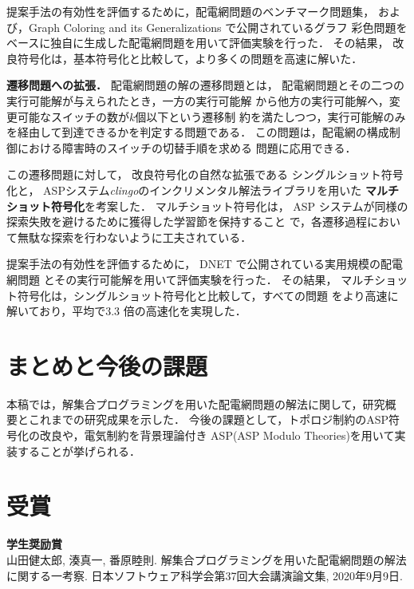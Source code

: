 \documentclass[a4j,10pt,dvipdfmx]{jarticle}
\begin{document}
\begin{multicols}{1}
提案手法の有効性を評価するために，配電網問題のベンチマーク問題集，
および，Graph Coloring and its Generalizations で公開されているグラフ
彩色問題をベースに独自に生成した配電網問題を用いて評価実験を行った．
その結果，
改良符号化は，基本符号化と比較して，より多くの問題を高速に解いた．

\textbf{遷移問題への拡張．}
配電網問題の解の遷移問題とは，
配電網問題とその二つの実行可能解が与えられたとき，一方の実行可能解
から他方の実行可能解へ，変更可能なスイッチの数が$k$個以下という遷移制
約を満たしつつ，実行可能解のみを経由して到達できるかを判定する問題である．
この問題は，配電網の構成制御における障害時のスイッチの切替手順を求める
問題に応用できる．

この遷移問題に対して，
改良符号化の自然な拡張である
シングルショット符号化と，
ASPシステム\textit{clingo}のインクリメンタル解法ライブラリを用いた
\textbf{マルチショット符号化}を考案した．
マルチショット符号化は，
ASP システムが同様の探索失敗を避けるために獲得した学習節を保持すること
で，各遷移過程において無駄な探索を行わないように工夫されている．

提案手法の有効性を評価するために，
DNET で公開されている実用規模の配電網問題
とその実行可能解を用いて評価実験を行った．
その結果，
マルチショット符号化は，シングルショット符号化と比較して，すべての問題
をより高速に解いており，平均で3.3 倍の高速化を実現した．

\section{まとめと今後の課題}
本稿では，解集合プログラミングを用いた配電網問題の解法に関して，研究概
要とこれまでの研究成果を示した．
%
今後の課題として，トポロジ制約のASP符号化の改良や，電気制約を背景理論付き
ASP(ASP Modulo Theories)を用いて実装することが挙げられる．

\section{受賞}
\noindent\textbf{学生奨励賞}\\
山田健太郎, 湊真一, 番原睦則.
解集合プログラミングを用いた配電網問題の解法に関する一考察. 
日本ソフトウェア科学会第37回大会講演論文集,
2020年9月9日. 


\end{multicols}
\end{document}
